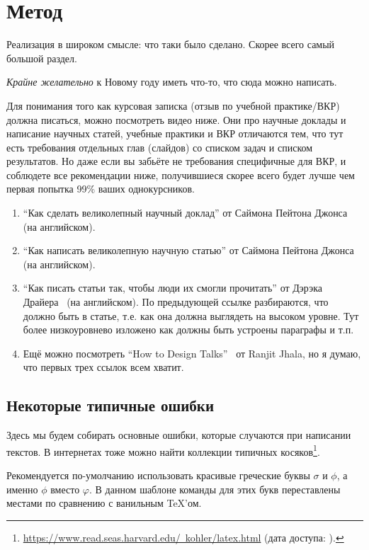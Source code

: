 
\section{Метод}
Реализация в широком смысле: что таки было сделано. Скорее всего самый большой раздел.

\emph{Крайне желательно} к Новому году иметь что-то, что сюда можно написать.

Для понимания того как курсовая записка (отзыв по учебной практи\-ке/ВКР) должна писаться, можно посмотреть видео ниже. Они про научные доклады и написание научных статей, учебные практики и ВКР отличаются тем, что тут есть требования отдельных глав (слайдов) со списком задач и списком результатов. Но даже если вы забьёте не требования специфичные для ВКР, и соблюдете все рекомендации ниже, получившиеся скорее всего будет лучше чем первая попытка 99\% ваших однокурсников.

\begin{enumerate}
\item ``Как сделать великолепный научный доклад'' от Саймона Пейтона Джонса~\cite{SPJGreatTalk} (на английском).
\item ``Как написать великолепную научную статью'' от Саймона Пейтона Джонса~\cite{SPJGreatPaper} (на английском).
\item ``Как писать статьи так, чтобы люди их смогли прочитать'' от Дэрэка Драйера~\cite{DreyerYoutube2020} (на английском). По предыдующей ссылке разбираются, что должно быть в статье, т.е. как она должна выгля\-деть на высоком уровне. Тут более низкоуровнево изложено как должны быть устроены параграфы и т.п.
\item Ещё можно посмотреть ``How to Design Talks''~\cite{JhalaYoutube2020} от Ranjit Jhala, но я думаю, что первых трех ссылок всем хватит.
\end{enumerate}


\subsection{Некоторые типичные ошибки}
Здесь мы будем собирать основные ошибки, которые случаются при написании текстов. 
В интернетах тоже можно найти коллекции типич\-ных косяков\footnote{\href{https://www.read.seas.harvard.edu/~kohler/latex.html}{https://www.read.seas.harvard.edu/~kohler/latex.html} (дата доступа:   ).}.

Рекомендуется по-умол\-ча\-нию использовать красивые греческие бук\-вы $\sigma$  и $\phi$, а именно $\phi$ вместо $\varphi$. В данном шаблоне команды для этих букв переставлены местами по сравнению с ванильным \TeX'ом.

